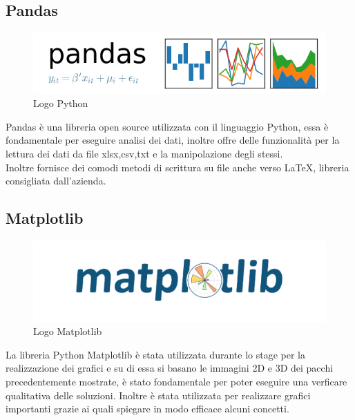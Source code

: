 \subsection{Pandas}
\begin{figure}[H]
	\begin{center} \includegraphics[scale=0.6]{figures/pandas_logo}
		\caption[Bin packing figures]{Logo Python}
	\end{center}
\end{figure}
Pandas è una libreria open source utilizzata con il linguaggio Python, essa è fondamentale per eseguire analisi dei dati, inoltre offre delle funzionalità per la lettura dei dati da file xlsx,csv,txt e la manipolazione degli stessi. \\
Inoltre fornisce dei comodi metodi di scrittura su file anche verso \LaTeX, libreria consigliata dall'azienda.

\subsection{Matplotlib}
\begin{figure}[H]
	\begin{center} \includegraphics[scale=0.4]{figures/matplotlib-1}
		\caption[Bin packing figures]{Logo Matplotlib}
	\end{center}
\end{figure}
La libreria Python Matplotlib è stata utilizzata durante lo stage per la realizzazione dei grafici e su di essa si basano le immagini 2D e 3D dei pacchi precedentemente mostrate, è stato fondamentale per poter eseguire una verficare qualitativa delle soluzioni. Inoltre è stata utilizzata per realizzare grafici importanti grazie ai quali spiegare in modo efficace alcuni concetti.

